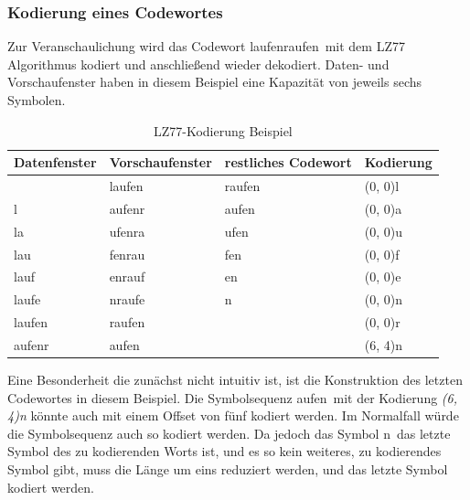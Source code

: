 \subsubsection{Kodierung eines Codewortes}
\label{subsubsec:kodierung_codewort}
Zur Veranschaulichung wird das Codewort \glqq laufenraufen\grqq\ mit dem LZ77 Algorithmus kodiert und anschließend wieder dekodiert.
Daten- und Vorschaufenster haben in diesem Beispiel eine Kapazität von jeweils sechs Symbolen. \newpage
\begin{table}[H]
\centering
\begin{tabular}{|l|l|l|l|}
\hline
\textbf{Datenfenster} & \textbf{Vorschaufenster} & \textbf{restliches Codewort} & \textbf{Kodierung} \\ \hline
                      & laufen                   & raufen                       & (0, 0)l            \\ \hline
l                     & aufenr                   & aufen                        & (0, 0)a            \\ \hline
la                    & ufenra                   & ufen                         & (0, 0)u            \\ \hline
lau                   & fenrau                   & fen                          & (0, 0)f            \\ \hline
lauf                  & enrauf                   & en                           & (0, 0)e            \\ \hline
laufe                 & nraufe                   & n                            & (0, 0)n            \\ \hline
laufen                & raufen                   &                              & (0, 0)r            \\ \hline
aufenr                & aufen                    &                              & (6, 4)n            \\ \hline
\end{tabular}
\label{tab:lz77_encode_table}
\caption{LZ77-Kodierung Beispiel}
\end{table}

Eine Besonderheit die zunächst nicht intuitiv ist, ist die Konstruktion des letzten Codewortes in diesem Beispiel.
Die Symbolsequenz \glqq aufen\grqq\ mit der Kodierung \textit{(6, 4)n} könnte auch mit einem Offset von fünf kodiert werden.
Im Normalfall würde die Symbolsequenz auch so kodiert werden.
Da jedoch das Symbol \glqq n\grqq\ das letzte Symbol des zu kodierenden Worts ist, und es so kein weiteres, zu kodierendes Symbol gibt, muss die Länge um eins reduziert werden, und das letzte Symbol kodiert werden. \newline

